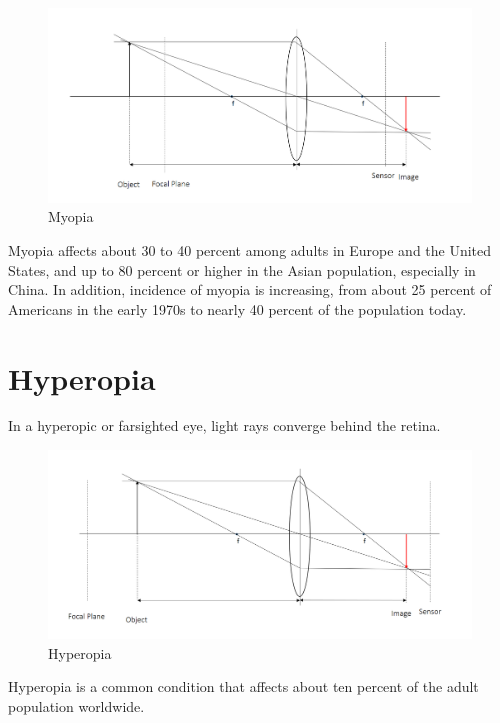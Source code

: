 \begin{figure}[ht]
  \centering
  \includegraphics[width=5.0in]{chapters/chapter2/images/myopia.png}
  \caption{Myopia}
  \label{fig:ferrari}
\end{figure}

Myopia affects about 30 to 40 percent among adults in Europe and the United States, and up to 80 percent or higher in the Asian population, especially in China. In addition, incidence of myopia is increasing, from about 25 percent of Americans in the early 1970s to nearly 40 percent of the population today.


\section{Hyperopia}
In a hyperopic or farsighted eye, light rays converge behind the retina. 

\begin{figure}[ht]
  \centering
  \includegraphics[width=5.0in]{chapters/chapter2/images/hyperopia.png}
  \caption{Hyperopia}
  \label{fig:ferrari}
\end{figure}

Hyperopia is a common condition that affects about ten percent of the adult population worldwide. 



